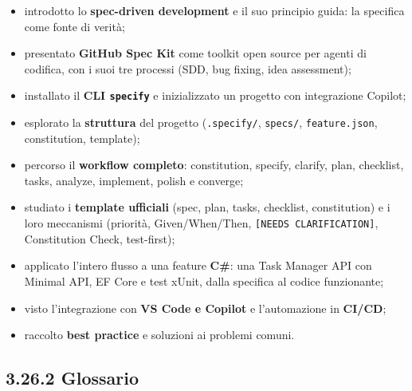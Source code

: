 \documentclass[
  italian,
  10pt,
]{book}
\providecommand{\tightlist}{%
  \setlength{\itemsep}{0pt}\setlength{\parskip}{0pt}}
\begin{document}
\begin{itemize}
\tightlist
\item
  introdotto lo \textbf{spec-driven development} e il suo principio
  guida: la specifica come fonte di verità;
\item
  presentato \textbf{GitHub Spec Kit} come toolkit open source per
  agenti di codifica, con i suoi tre processi (SDD, bug fixing, idea
  assessment);
\item
  installato il \textbf{CLI \texttt{specify}} e inizializzato un
  progetto con integrazione Copilot;
\item
  esplorato la \textbf{struttura} del progetto (\texttt{.specify/},
  \texttt{specs/}, \texttt{feature.json}, constitution, template);
\item
  percorso il \textbf{workflow completo}: constitution, specify,
  clarify, plan, checklist, tasks, analyze, implement, polish e
  converge;
\item
  studiato i \textbf{template ufficiali} (spec, plan, tasks, checklist,
  constitution) e i loro meccanismi (priorità, Given/When/Then,
  \texttt{{[}NEEDS\ CLARIFICATION{]}}, Constitution Check, test-first);
\item
  applicato l'intero flusso a una feature \textbf{C\#}: una Task Manager
  API con Minimal API, EF Core e test xUnit, dalla specifica al codice
  funzionante;
\item
  visto l'integrazione con \textbf{VS Code e Copilot} e l'automazione in
  \textbf{CI/CD};
\item
  raccolto \textbf{best practice} e soluzioni ai problemi comuni.
\end{itemize}

\subsection{3.26.2 Glossario}\label{glossario}
\end{document}
